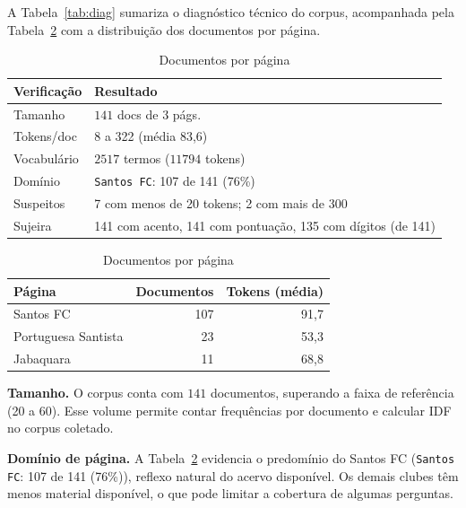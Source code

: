 \documentclass[
  article,
  12pt,
  oneside,
  a4paper,
  english,
  brazil
]{abntex2}\usepackage[]{graphicx}\usepackage[]{xcolor}
\begin{document}
A Tabela~\ref{tab:diag} sumariza o diagnóstico técnico do corpus, acompanhada pela Tabela~\ref{tab:origem} com a distribuição dos documentos por página.

\begin{table}[!htbp]
  \centering
  \begin{minipage}[t]{0.53\textwidth}
    \caption{Diagnóstico do corpus}
    \label{tab:diag}
    \scriptsize
    \begin{tabular}{@{}p{}p{}@{}}
      \toprule
      \textbf{Verificação} & \textbf{Resultado} \\
      \midrule
      Tamanho & $\text{141}$ docs de $\text{3}$ págs. \\
      Tokens/doc & 8 a 322 (m\'edia 83,6) \\
      Vocabulário & $\text{2517}$ termos ($\text{11794}$ tokens) \\
      Domínio & \texttt{Santos FC}: 107 de 141 (76\%) \\
      Suspeitos & 7 com menos de 20 tokens; 2 com mais de 300 \\
      Sujeira & 141 com acento, 141 com pontua\c{c}\~ao, 135 com d\'igitos (de 141) \\
      \bottomrule
    \end{tabular}
  \end{minipage}\hfill
  \begin{minipage}[t]{0.43\textwidth}
    \caption{Documentos por página}
    \label{tab:origem}
    \scriptsize

\begin{tabular}{lrr}
\toprule
P\'agina & Documentos & Tokens (m\'edia)\\
\midrule
Santos FC & 107 & 91,7\\
Portuguesa Santista & 23 & 53,3\\
Jabaquara & 11 & 68,8\\
\bottomrule
\end{tabular}


  \end{minipage}
\end{table}

\textbf{Tamanho.} O corpus conta com $\text{141}$ documentos, superando a faixa de referência (20 a 60). Esse volume permite contar frequências por documento e calcular IDF no corpus coletado.

\textbf{Domínio de página.} A Tabela~\ref{tab:origem} evidencia o predomínio do Santos FC (\texttt{Santos FC}: 107 de 141 (76\%)), reflexo natural do acervo disponível. Os demais clubes têm menos material disponível, o que pode limitar a cobertura de algumas perguntas.
\end{document}
